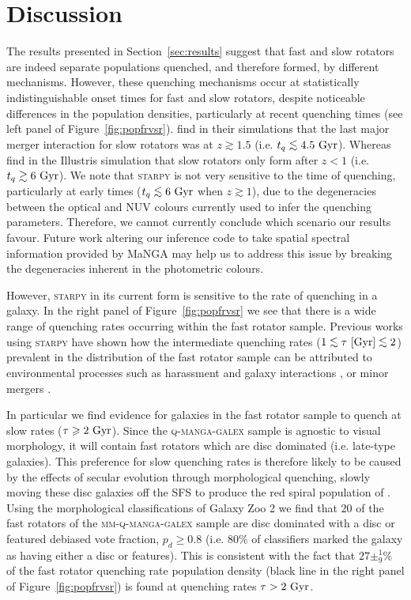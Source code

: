 \documentclass[useAMS,usenatbib]{mn2e}
\def\lesssim{\mathrel{\hbox{\rlap{\hbox{\lower3pt\hbox{$\sim$}}}\hbox{\raise2pt\hbox{$<$}}}}}
\begin{document}
\section{Discussion}\label{sec:discussion}

The results presented in Section~\ref{sec:results} suggest that fast and slow rotators are indeed separate populations quenched, and therefore formed, by different mechanisms. However, these quenching mechanisms occur at statistically indistinguishable onset times for fast and slow rotators, despite noticeable differences in the population densities, particularly at recent quenching times (see left panel of Figure~\ref{fig:popfrvsr}). \cite{khochfar11} find in their simulations that the last major merger interaction for slow rotators was at $z \gtrsim 1.5$ (i.e. $t_q \lesssim 4.5~\rm{Gyr}$). Whereas \cite{penoyre17}  find in the Illustris simulation that slow rotators only form after $z < 1$ (i.e. $t_q \gtrsim 6~\rm{Gyr}$). We note that \textsc{starpy} is not very sensitive to the time of quenching, particularly at early times ($t_q \lesssim 6~\rm{Gyr}$ when $z \gtrsim 1$), due to the degeneracies between the optical and NUV colours currently used to infer the quenching parameters. Therefore, we cannot currently conclude which scenario our results favour. Future work altering our inference code to take spatial spectral information provided by MaNGA may help us to address this issue by breaking the degeneracies inherent in the photometric colours.

However, \textsc{starpy} in its current form is sensitive to the rate of quenching in a galaxy. In the right panel of Figure~\ref{fig:popfrvsr} we see that there is a wide range of quenching rates occurring within the fast rotator sample. Previous works using \textsc{starpy} have shown how the intermediate quenching rates ($1 \lesssim \tau~[\rm{Gyr}]\lesssim 2$) prevalent in the distribution of the fast rotator sample can be attributed to environmental processes such as harassment and galaxy interactions \citep{smethurst17}, or minor mergers \citep{smethurst15}.  

In particular we find evidence for galaxies in the fast rotator sample to quench at slow rates ($\tau \geq 2~\rm{Gyr}$). Since the \textsc{q-manga-galex} sample is agnostic to visual morphology, it will contain fast rotators which are disc dominated (i.e. late-type galaxies). This preference for slow quenching rates is therefore likely to be caused by the effects of secular evolution through morphological quenching, slowly moving these disc galaxies off the SFS to produce the red spiral population of \cite{masters12a}. Using the morphological classifications of Galaxy Zoo 2 \citep[GZ2][]{lintott11, GZ2} we find that $20$ of the fast rotators of the \textsc{mm-q-manga-galex} sample are disc dominated with a disc or featured debiased vote fraction, $p_d \geq 0.8$ (i.e. $80\%$ of classifiers marked the galaxy as having either a disc or features). This is consistent with the fact that $27\pm^{1}_{9}\%$ of the fast rotator quenching rate population density (black line in the right panel of Figure~\ref{fig:popfrvsr}) is found at quenching rates $\tau > 2~\rm{Gyr}$. 
\end{document}
